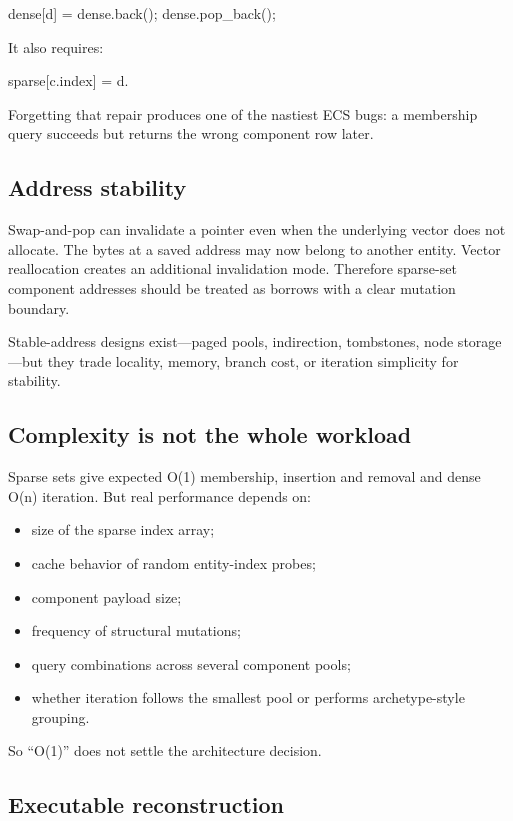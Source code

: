 dense{[}d{]} = dense.back(); dense.pop\_back();

It also requires:

sparse{[}c.index{]} = d.

Forgetting that repair produces one of the nastiest ECS bugs: a membership query succeeds but returns the wrong component row later.

\subsection{Address stability}\label{appendix-8404d0b1a3e7-address-stability}

Swap-and-pop can invalidate a pointer even when the underlying vector does not allocate. The bytes at a saved address may now belong to another entity. Vector reallocation creates an additional invalidation mode. Therefore sparse-set component addresses should be treated as borrows with a clear mutation boundary.

Stable-address designs exist---paged pools, indirection, tombstones, node storage---but they trade locality, memory, branch cost, or iteration simplicity for stability.

\subsection{Complexity is not the whole workload}\label{appendix-8404d0b1a3e7-complexity-is-not-the-whole-workload}

Sparse sets give expected O(1) membership, insertion and removal and dense O(n) iteration. But real performance depends on:

\begin{itemize}
\tightlist
\item
  size of the sparse index array;
\item
  cache behavior of random entity-index probes;
\item
  component payload size;
\item
  frequency of structural mutations;
\item
  query combinations across several component pools;
\item
  whether iteration follows the smallest pool or performs archetype-style grouping.
\end{itemize}

So ``O(1)'' does not settle the architecture decision.

\subsection{Executable reconstruction}\label{appendix-8404d0b1a3e7-executable-reconstruction}

